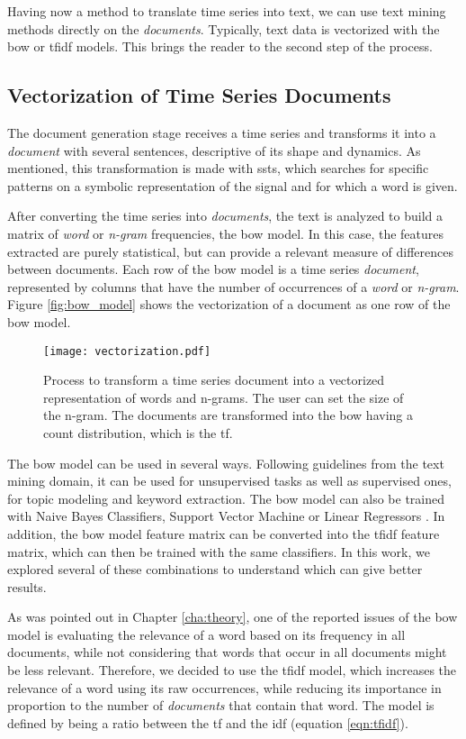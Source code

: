 Having now a method to translate time series into text, we can use text mining methods directly on the \textit{documents}. Typically, text data is vectorized with the \gls{bow} or \gls{tfidf} models. This brings the reader to the second step of the process.

\subsection{Vectorization of Time Series Documents}

The document generation stage receives a time series and transforms it into a \textit{document} with several sentences, descriptive of its shape and dynamics. As mentioned, this transformation is made with \gls{ssts}, which searches for specific patterns on a symbolic representation of the signal and for which a word is given.  
\par
After converting the time series into \textit{documents}, the text is analyzed to build a matrix of \textit{word} or \textit{n-gram }frequencies, the \gls{bow} model. In this case, the features extracted are purely statistical, but can provide a relevant measure of differences between documents. Each row of the \gls{bow} model is a time series \textit{document}, represented by columns that have the number of occurrences of a \textit{word} or \textit{n-gram}. Figure \ref{fig:bow_model} shows the vectorization of a document as one row of the \gls{bow} model.

\begin{figure}[!h]
    \centering
    \texttt{[image: vectorization.pdf]}
    \caption{Process to transform a time series document into a vectorized representation of words and n-grams. The user can set the size of the n-gram. The documents are transformed into the \gls{bow} having a count distribution, which is the \gls{tf}.}
    \label{fig:sentence_gen}
\end{figure}

The \gls{bow} model can be used in several ways. Following guidelines from the text mining domain, it can be used for unsupervised tasks as well as supervised ones, for topic modeling and keyword extraction. The \gls{bow} model can also be trained with Naive Bayes Classifiers, Support Vector Machine or Linear Regressors \cite{scikit-learn}. In addition, the \gls{bow} model feature matrix can be converted into the \gls{tfidf} feature matrix, which can then be trained with the same classifiers. In this work, we explored several of these combinations to understand which can give better results.
\par
As was pointed out in Chapter \ref{cha:theory}, one of the reported issues of the \gls{bow} model is evaluating the relevance of a word based on its frequency in all documents, while not considering that words that occur in all documents might be less relevant. Therefore, we decided to use the \gls{tfidf} model, which increases the relevance of a word using its raw occurrences, while reducing its importance in proportion to the number of \textit{documents} that contain that word. The model is defined by being a ratio between the \gls{tf} and the \gls{idf} (equation \ref{eqn:tfidf}).

